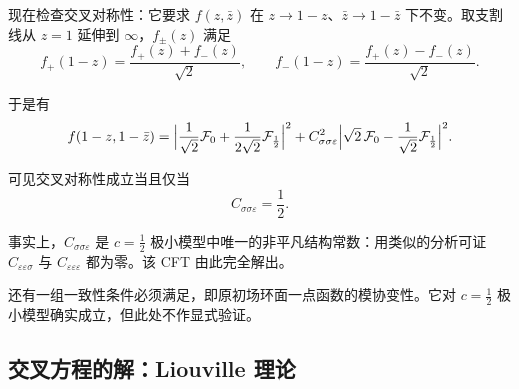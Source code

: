 现在检查交叉对称性：它要求 $f(z,\bar z)$ 在 $z\to1-z$、$\bar z\to1-\bar z$ 下不变。取支割线从 $z=1$ 延伸到 $\infty$，$f_\pm(z)$ 满足
\begin{equation}\label{eq:3-45}
  f_+(1-z)=\frac{f_+(z)+f_-(z)}{\sqrt2},\qquad
  f_-(1-z)=\frac{f_+(z)-f_-(z)}{\sqrt2} .
\end{equation}


于是有
\begin{equation}\label{eq:3-46}
  f(1-z,1-\bar z)
  =\Bigl|\frac{1}{\sqrt2}\mathcal{F}_0+\frac{1}{2\sqrt2}\mathcal{F}_{\frac12}\Bigr|^2
  +C_{\sigma\sigma\varepsilon}^2
  \Bigl|\sqrt2\,\mathcal{F}_0-\frac{1}{\sqrt2}\mathcal{F}_{\frac12}\Bigr|^2 .
\end{equation}


可见交叉对称性成立当且仅当
\begin{equation}\label{eq:3-47}
  C_{\sigma\sigma\varepsilon}=\frac12 .
\end{equation}

事实上，$C_{\sigma\sigma\varepsilon}$ 是 $c=\frac12$ 极小模型中唯一的非平凡结构常数：用类似的分析可证 $C_{\varepsilon\varepsilon\sigma}$ 与 $C_{\varepsilon\varepsilon\varepsilon}$ 都为零。该 CFT 由此完全解出。

还有一组一致性条件必须满足，即原初场环面一点函数的模协变性。它对 $c=\frac12$ 极小模型确实成立，但此处不作显式验证。


\subsection{交叉方程的解：Liouville 理论}

